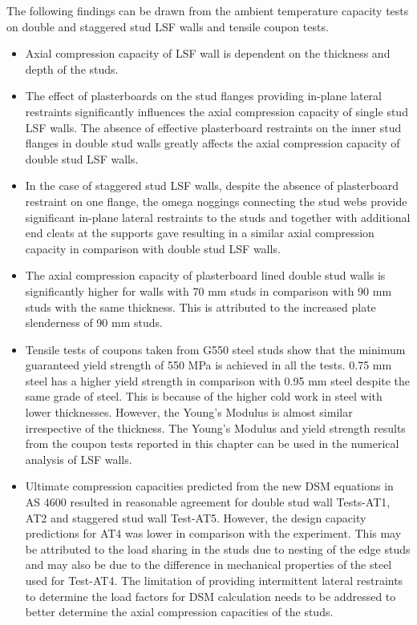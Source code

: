 The following findings can be drawn from the ambient temperature capacity tests on double and staggered stud LSF walls and tensile coupon tests.
\begin{itemize}
	\item Axial compression capacity of LSF wall is dependent on the thickness and depth of the studs.
	\item The effect of plasterboards on the stud flanges providing in-plane lateral restraints significantly influences the axial compression capacity of single stud LSF walls. The absence of effective plasterboard restraints on the inner stud flanges in double stud walls greatly affects the axial compression capacity of double stud LSF walls.
	\item In the case of staggered stud LSF walls, despite the absence of plasterboard restraint on one flange, the omega noggings connecting the stud webs provide significant in-plane lateral restraints to the studs and together with additional end cleats at the supports gave resulting in a similar axial compression capacity in comparison with double stud LSF walls.
	\item The axial compression capacity of plasterboard lined double stud walls is significantly higher for walls with 70 mm studs in comparison with 90 mm studs with the same thickness. This is attributed to the increased plate slenderness of 90 mm studs. 
	\item Tensile tests of coupons taken from G550 steel studs show that the minimum guaranteed yield strength of 550 MPa is achieved in all the tests. 0.75 mm steel has a higher yield strength in comparison with 0.95 mm steel despite the same grade of steel. This is because of the higher cold work in steel with lower thicknesses. However, the Young's Modulus is almost similar irrespective of the thickness. The Young's Modulus and yield strength results from the coupon tests reported in this chapter can be used in the numerical analysis of LSF walls. 
	\item Ultimate compression capacities predicted from the new DSM equations in AS 4600 resulted in reasonable agreement for double stud wall Tests-AT1, AT2 and staggered stud wall Test-AT5. However, the design capacity predictions for AT4 was lower in comparison with the experiment. This may be attributed to the load sharing in the studs due to nesting of the edge studs and may also be due to the difference in mechanical properties of the steel used for Test-AT4. The limitation of providing intermittent lateral restraints to determine the load factors for DSM calculation needs to be addressed to better determine the axial compression capacities of the studs. 
\end{itemize}
  
  
  
